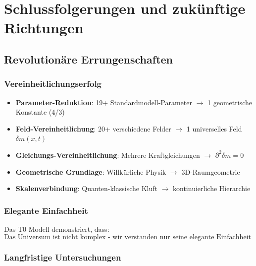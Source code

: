 	\section{Schlussfolgerungen und zukünftige Richtungen}
	\label{sec:schlussfolgerungen}
	
	\subsection{Revolutionäre Errungenschaften}
	\label{subsec:revolutionaere_errungenschaften}
	
	\subsubsection{Vereinheitlichungserfolg}
	\label{subsubsec:vereinheitlichungserfolg}
	
	\begin{tcolorbox}[colback=yellow!10!white,colframe=orange!75!black,title=T0-Theorie Revolutionäre Errungenschaften]
		\begin{itemize}
			\item \textbf{Parameter-Reduktion}: 19+ Standardmodell-Parameter $\rightarrow$ 1 geometrische Konstante (4/3)
			\item \textbf{Feld-Vereinheitlichung}: 20+ verschiedene Felder $\rightarrow$ 1 universelles Feld $\delta m(x,t)$
			\item \textbf{Gleichungs-Vereinheitlichung}: Mehrere Kraftgleichungen $\rightarrow$ $\partial^2\delta m = 0$
			\item \textbf{Geometrische Grundlage}: Willkürliche Physik $\rightarrow$ 3D-Raumgeometrie
			\item \textbf{Skalenverbindung}: Quanten-klassische Kluft $\rightarrow$ kontinuierliche Hierarchie
		\end{itemize}
	\end{tcolorbox}
	
	\subsubsection{Elegante Einfachheit}
	\label{subsubsec:elegante_einfachheit}
	
	Das T0-Modell demonstriert, dass:
	\begin{equation}
		\boxed{\text{Das Universum ist nicht komplex - wir verstanden nur seine elegante Einfachheit nicht}}
		\label{eq:elegante_wahrheit}
	\end{equation}

	
	\subsubsection{Langfristige Untersuchungen}
	\label{subsubsec:langfristige_untersuchungen}
	
